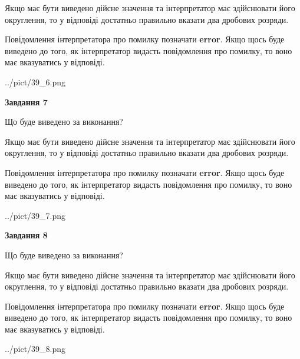 \documentclass[12pt, ukrainian]{article}
\begin{document}
{\begin {Large}
Якщо має бути виведено дійсне значення та інтерпретатор має здійснювати його округлення, 
то у відповіді достатньо правильно вказати два дробових розряди.

Повідомлення інтерпретатора про помилку позначати \textbf{error}.
Якщо щось буде виведено до того, як інтерпретатор видасть повідомлення про помилку, 
то воно має вказуватись у відповіді. \par

\begin{center}
	{../pict/39_6.png}
\end{center}
\newpage

{\begin {center}\textbf{Завдання 7}\end {center}}\par
Що буде виведено за виконання? \par

Якщо має бути виведено дійсне значення та інтерпретатор має здійснювати його округлення, 
то у відповіді достатньо правильно вказати два дробових розряди.

Повідомлення інтерпретатора про помилку позначати \textbf{error}.
Якщо щось буде виведено до того, як інтерпретатор видасть повідомлення про помилку, 
то воно має вказуватись у відповіді. \par

\begin{center}
	{../pict/39_7.png}
\end{center}
\newpage

{\begin {center}\textbf{Завдання 8}\end {center}}\par
Що буде виведено за виконання? \par

Якщо має бути виведено дійсне значення та інтерпретатор має здійснювати його округлення, 
то у відповіді достатньо правильно вказати два дробових розряди.

Повідомлення інтерпретатора про помилку позначати \textbf{error}.
Якщо щось буде виведено до того, як інтерпретатор видасть повідомлення про помилку, 
то воно має вказуватись у відповіді. \par

\begin{center}
	{../pict/39_8.png}
\end{center}
\newpage


\end{Large}}
\end{document}
